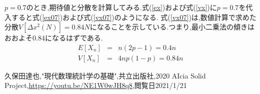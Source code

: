 \documentclass[a4j]{jarticle}
\begin{document}
  $p=0.7$のとき,期待値と分散を計算してみる.式(\ref{ex})および式(\ref{vx})に$p=0.7$を代入すると式(\ref{ex07})および式(\ref{vx07})のようになる.
  式(\ref{vx07})は,数値計算で求めた分散$V[\Delta x^2(N)]=0.84N$になることを示している.つまり,最小二乗法の傾きはおおよそ$0.84$になるはずである.
  \begin{eqnarray}
    E[X_n] &=&  n(2p-1) = 0.4n \label{ex07} \\
    V[X_n] &=& 4np(1-p) = 0.84n \label{vx07}
  \end{eqnarray}

        \begin{thebibliography}{9}
            久保田達也,"現代数理統計学の基礎",共立出版社,2020
           AIcia Solid Project,\url{https://youtu.be/NE1W0wJH8q8},閲覧日2021/1/21
          \end{thebibliography}
\end{document}
